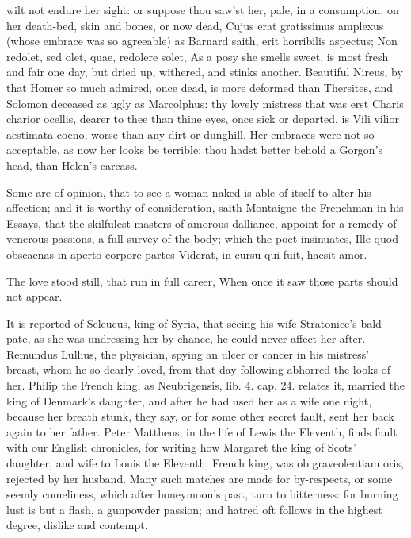 {wilt not endure her sight: or suppose thou saw'st her, pale, in a
consumption, on her death-bed, skin and bones, or now dead, Cujus erat
gratissimus amplexus (whose embrace was so agreeable) as Barnard saith,
erit horribilis aspectus; Non redolet, sed olet, quae, redolere solet,
As a posy she smells sweet, is most fresh and fair one day, but dried
up, withered, and stinks another. Beautiful Nireus, by that Homer so
much admired, once dead, is more deformed than Thersites, and Solomon
deceased as ugly as Marcolphus: thy lovely mistress that was erst
Charis charior ocellis, dearer to thee than thine eyes, once sick
or departed, is Vili vilior aestimata coeno, worse than any dirt or
dunghill. Her embraces were not so acceptable, as now her looks be
terrible: thou hadst better behold a Gorgon's head, than Helen's
carcass.

Some are of opinion, that to see a woman naked is able of itself to
alter his affection; and it is worthy of consideration, saith
Montaigne the Frenchman in his Essays, that the skilfulest
masters of amorous dalliance, appoint for a remedy of venerous
passions, a full survey of the body; which the poet insinuates,
Ille quod obscaenas in aperto corpore partes
Viderat, in cursu qui fuit, haesit amor.

The love stood still, that run in full career,
When once it saw those parts should not appear.

It is reported of Seleucus, king of Syria, that seeing his wife
Stratonice's bald pate, as she was undressing her by chance, he could
never affect her after. Remundus Lullius, the physician, spying an
ulcer or cancer in his mistress' breast, whom he so dearly loved, from
that day following abhorred the looks of her. Philip the French king,
as Neubrigensis, lib. 4. cap. 24. relates it, married the king of
Denmark's daughter, and after he had used her as a wife one
night, because her breath stunk, they say, or for some other secret
fault, sent her back again to her father. Peter Mattheus, in the life
of Lewis the Eleventh, finds fault with our English chronicles,
for writing how Margaret the king of Scots' daughter, and wife to Louis
the Eleventh, French king, was ob graveolentiam oris, rejected by her
husband. Many such matches are made for by-respects, or some seemly
comeliness, which after honeymoon's past, turn to bitterness: for
burning lust is but a flash, a gunpowder passion; and hatred oft
follows in the highest degree, dislike and contempt.

}
